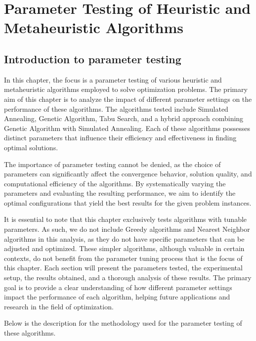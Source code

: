 \documentclass{article}
\begin{document}
    \newpage


    \section{Parameter Testing of Heuristic and Metaheuristic Algorithms}\label{sec:parameter-testing-of-heuristic-and-metaheuristic-algorithms}

    \subsection{Introduction to parameter testing}\label{subsec:introduction2}

    In this chapter, the focus is a parameter testing of various heuristic and metaheuristic algorithms employed to solve optimization problems. The primary aim of this chapter is to analyze the impact of different parameter settings on the performance of these algorithms. The algorithms tested include Simulated Annealing, Genetic Algorithm, Tabu Search, and a hybrid approach combining Genetic Algorithm with Simulated Annealing. Each of these algorithms possesses distinct parameters that influence their efficiency and effectiveness in finding optimal solutions.

    The importance of parameter testing cannot be denied, as the choice of parameters can significantly affect the convergence behavior, solution quality, and computational efficiency of the algorithms. By systematically varying the parameters and evaluating the resulting performance, we aim to identify the optimal configurations that yield the best results for the given problem instances.

    It is essential to note that this chapter exclusively tests algorithms with tunable parameters. As such, we do not include Greedy algorithms and Nearest Neighbor algorithms in this analysis, as they do not have specific parameters that can be adjusted and optimized. These simpler algorithms, although valuable in certain contexts, do not benefit from the parameter tuning process that is the focus of this chapter.
    Each section will present the parameters tested, the experimental setup, the results obtained, and a thorough analysis of these results. The primary goal is to provide a clear understanding of how different parameter settings impact the performance of each algorithm, helping future applications and research in the field of optimization.

    \noindent Below is the description for the methodology used for the parameter testing of these algorithms.
\end{document}
